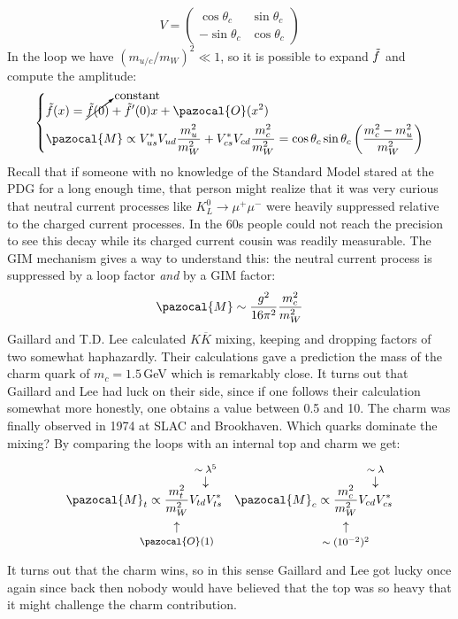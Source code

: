 \documentclass[../main.tex]{subfiles}
\begin{document}
\[
V=\left(\begin{array}{cc}
    \cos\theta_c & \sin\theta_c \\
    -\sin\theta_c & \cos\theta_c
\end{array}\right)
\]
In the loop we have $(m_{u/c}/m_W)^2\ll1$, so it is possible to expand $\Tilde{f}$ and compute the amplitude:
\[
\left\{
\begin{aligned}
&\Tilde{f}(x)=\cancelto{\text{constant}}{\Tilde{f}(0)}+\Tilde{f}'(0)x+\pazocal{O}(x^2)\\
&\pazocal{M}\propto V_{us}^*V_{ud}\frac{m_u^2}{m_W^2}+V_{cs}^*V_{cd}\frac{m_c^2}{m_W^2}=\cos\theta_c\sin\theta_c\left(\frac{m_c^2-m_u^2}{m_W^2}\right)
\end{aligned}
\right.
\]
Recall that if someone with no knowledge of the Standard Model
stared at the PDG for a long enough time, that person might realize that it was very curious that
neutral current processes like $K_L^0\to\mu^+\mu^-$ were heavily suppressed relative to the charged current
processes. In the 60s people could not reach the precision to see this decay while its charged current
cousin was readily measurable. The GIM mechanism gives a way to understand this: the neutral current process is
suppressed by a loop factor \textit{and} by a GIM factor:
\[
\pazocal{M}\sim\frac{g^2}{16\pi^2}\frac{m_c^2}{m_W^2}
\]
Gaillard and T.D. Lee calculated $K\overline{K}$ mixing, keeping and dropping factors of two somewhat
haphazardly. Their calculations gave a prediction the mass of the charm quark of $m_c=1.5$\,GeV which is remarkably close. It turns out that Gaillard and Lee
had luck on their side, since if one follows their calculation somewhat more honestly, one obtains a value between 0.5 and 10. The charm was finally observed in 1974 at SLAC and Brookhaven. Which quarks dominate the mixing? By comparing the loops with an internal top and charm we get:
\[
\pazocal{M}_t\propto\underset{\mathclap{\tikz \node {$\uparrow$} node [below=1ex] {\footnotesize  $\pazocal{O}(1)$};}}{\frac{m_t^2}{m_W^2}}\overset{\mathclap{\tikz \node {$\downarrow$} node [above=1ex] {\footnotesize $\sim\lambda^5$};}}{V_{td}V_{ts}^*} \quad \pazocal{M}_c\propto\underset{\mathclap{\tikz \node {$\uparrow$} node [below=1ex] {\footnotesize  $\sim(10^{-2})^2$};}}{\frac{m_c^2}{m_W^2}}\overset{\mathclap{\tikz \node {$\downarrow$} node [above=1ex] {\footnotesize $\sim\lambda$};}}{V_{cd}V_{cs}^*}
\]
It turns out that the charm wins, so in this sense Gaillard and Lee got lucky once again since back then nobody would have believed that the top was so heavy that it might challenge the charm contribution.
\end{document}
